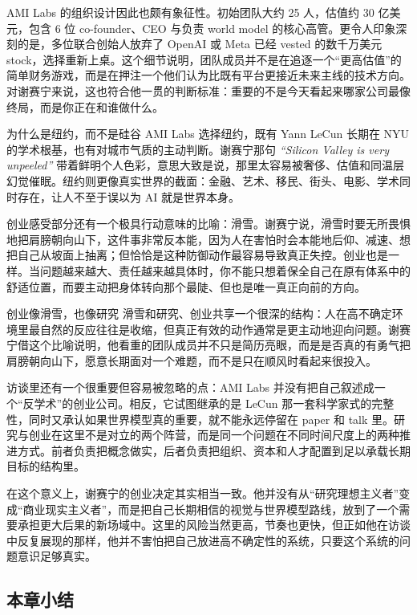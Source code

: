 \documentclass[a4paper,12pt]{article}
\begin{document}
AMI Labs 的组织设计因此也颇有象征性。初始团队大约 25 人，估值约 30 亿美元，包含 6 位 co-founder、CEO 与负责 world model 的核心高管。更令人印象深刻的是，多位联合创始人放弃了 OpenAI 或 Meta 已经 vested 的数千万美元 stock，选择重新上桌。这个细节说明，团队成员并不是在追逐一个“更高估值”的简单财务游戏，而是在押注一个他们认为比既有平台更接近未来主线的技术方向。对谢赛宁来说，这也符合他一贯的判断标准：重要的不是今天看起来哪家公司最像终局，而是你正在和谁做什么。

\begin{knowledgebox}{为什么是纽约，而不是硅谷}
AMI Labs 选择纽约，既有 Yann LeCun 长期在 NYU 的学术根基，也有对城市气质的主动判断。谢赛宁那句 \textit{``Silicon Valley is very unpeeled''} 带着鲜明个人色彩，意思大致是说，那里太容易被奢侈、估值和同温层幻觉催眠。纽约则更像真实世界的截面：金融、艺术、移民、街头、电影、学术同时存在，让人不至于误以为 AI 就是世界本身。
\end{knowledgebox}

创业感受部分还有一个极具行动意味的比喻：滑雪。谢赛宁说，滑雪时要无所畏惧地把肩膀朝向山下，这件事非常反本能，因为人在害怕时会本能地后仰、减速、想把自己从坡面上抽离；但恰恰是这种防御动作最容易导致真正失控。创业也是一样。当问题越来越大、责任越来越具体时，你不能只想着保全自己在原有体系中的舒适位置，而要主动把身体转向那个最陡、但也是唯一真正向前的方向。

\begin{importantbox}{创业像滑雪，也像研究}
滑雪和研究、创业共享一个很深的结构：人在高不确定环境里最自然的反应往往是收缩，但真正有效的动作通常是更主动地迎向问题。谢赛宁借这个比喻说明，他看重的团队成员并不只是简历亮眼，而是是否真的有勇气把肩膀朝向山下，愿意长期面对一个难题，而不是只在顺风时看起来很投入。
\end{importantbox}

访谈里还有一个很重要但容易被忽略的点：AMI Labs 并没有把自己叙述成一个“反学术”的创业公司。相反，它试图继承的是 LeCun 那一套科学家式的完整性，同时又承认如果世界模型真的重要，就不能永远停留在 paper 和 talk 里。研究与创业在这里不是对立的两个阵营，而是同一个问题在不同时间尺度上的两种推进方式。前者负责把概念做实，后者负责把组织、资本和人才配置到足以承载长期目标的结构里。

在这个意义上，谢赛宁的创业决定其实相当一致。他并没有从“研究理想主义者”变成“商业现实主义者”，而是把自己长期相信的视觉与世界模型路线，放到了一个需要承担更大后果的新场域中。这里的风险当然更高，节奏也更快，但正如他在访谈中反复展现的那样，他并不害怕把自己放进高不确定性的系统，只要这个系统的问题意识足够真实。

\subsection{本章小结}
\end{document}

